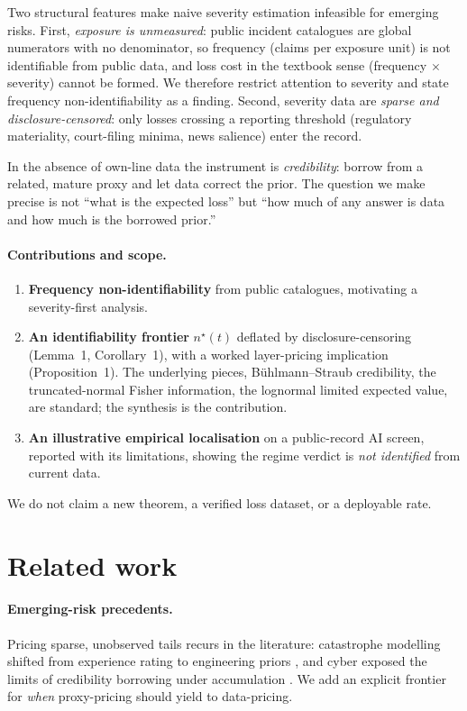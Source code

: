 \documentclass[11pt]{article}
\begin{document}
Two structural features make naive severity estimation infeasible for emerging risks. First,
\emph{exposure is unmeasured}: public incident catalogues are global numerators with no
denominator, so frequency (claims per exposure unit) is not identifiable from public data, and
loss cost in the textbook sense (frequency $\times$ severity) cannot be formed. We therefore
restrict attention to severity and state frequency non-identifiability as a finding. Second,
severity data are \emph{sparse and disclosure-censored}: only losses crossing a reporting
threshold (regulatory materiality, court-filing minima, news salience) enter the record.

In the absence of own-line data the instrument is \emph{credibility}: borrow from a related,
mature proxy and let data correct the prior. The question we make precise is not ``what is the
expected loss'' but ``how much of any answer is data and how much is the borrowed prior.''

\paragraph{Contributions and scope.}
\begin{enumerate}
\item \textbf{Frequency non-identifiability} from public catalogues, motivating a severity-first analysis.
\item \textbf{An identifiability frontier} $n^\star(t)$ deflated by disclosure-censoring
(Lemma~1, Corollary~1), with a worked layer-pricing implication (Proposition~1). The underlying
pieces, B\"uhlmann--Straub credibility, the truncated-normal Fisher information, the lognormal
limited expected value, are standard; the synthesis is the contribution.
\item \textbf{An illustrative empirical localisation} on a public-record AI screen, reported
with its limitations, showing the regime verdict is \emph{not identified} from current data.
\end{enumerate}
We do not claim a new theorem, a verified loss dataset, or a deployable rate.

\section{Related work}
\paragraph{Emerging-risk precedents.} Pricing sparse, unobserved tails recurs in the
literature: catastrophe modelling shifted from experience rating to engineering priors
\citep{clark2002cat}, and cyber exposed the limits of credibility borrowing under accumulation
\citep{biener2015cyber}. We add an explicit frontier for \emph{when} proxy-pricing should yield
to data-pricing.
\end{document}
